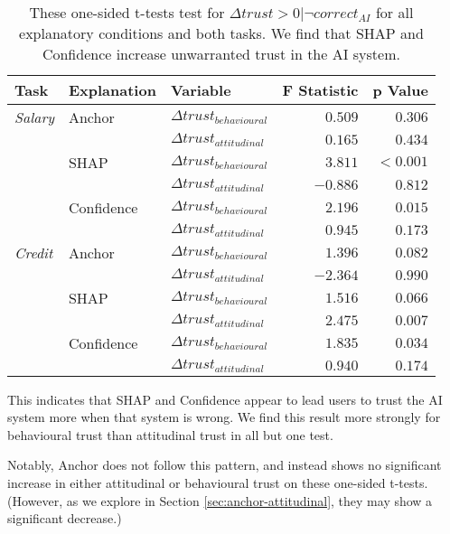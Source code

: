 \begin{table}[htb]
    \centering
    \caption{These one-sided t-tests test for $\Delta trust > 0 | \neg correct_{AI}$ for all explanatory conditions and both tasks. We find that SHAP and Confidence increase unwarranted trust in the AI system.}
    \label{tab:delta-trust-t}
    \begin{tabular}{l l l r r}
        \toprule
        Task & Explanation & Variable & F Statistic & p Value \\ 
        \midrule
        \emph{Salary} & Anchor & $\Delta trust_{behavioural}$ & $0.509$ & $0.306$ \\
        & & $\Delta trust_{attitudinal}$ & $0.165$ & $0.434$ \\
        & SHAP & $\Delta trust_{behavioural}$ & $\mathbf{3.811}$ & $\mathbf{<0.001}$ \\
        & & $\Delta trust_{attitudinal}$ & $-0.886$ & $0.812$ \\
        & Confidence & $\Delta trust_{behavioural}$ & $\mathbf{2.196}$ & $\mathbf{0.015}$ \\
        & & $\Delta trust_{attitudinal}$ & $0.945$ & $0.173$ \\
        \midrule
        \emph{Credit} & Anchor & $\Delta trust_{behavioural}$ & $1.396$ & $0.082$ \\
        & & $\Delta trust_{attitudinal}$ & $-2.364$ & $0.990$ \\
        & SHAP & $\Delta trust_{behavioural}$ & $1.516$ & $0.066$ \\
        & & $\Delta trust_{attitudinal}$ & $\mathbf{2.475}$ & $\mathbf{0.007}$ \\
        & Confidence & $\Delta trust_{behavioural}$ & $\mathbf{1.835}$ & $\mathbf{0.034}$ \\
        & & $\Delta trust_{attitudinal}$ & $0.940$ & $0.174$ \\
        \bottomrule
    \end{tabular}
\end{table}

This indicates that SHAP and Confidence appear to lead users to trust the AI system more when that system is wrong. We find this result more strongly for behavioural trust than attitudinal trust in all but one test.

Notably, Anchor does not follow this pattern, and instead shows no significant increase in either attitudinal or behavioural trust on these one-sided t-tests. (However, as we explore in Section \ref{sec:anchor-attitudinal}, they may show a significant decrease.)

